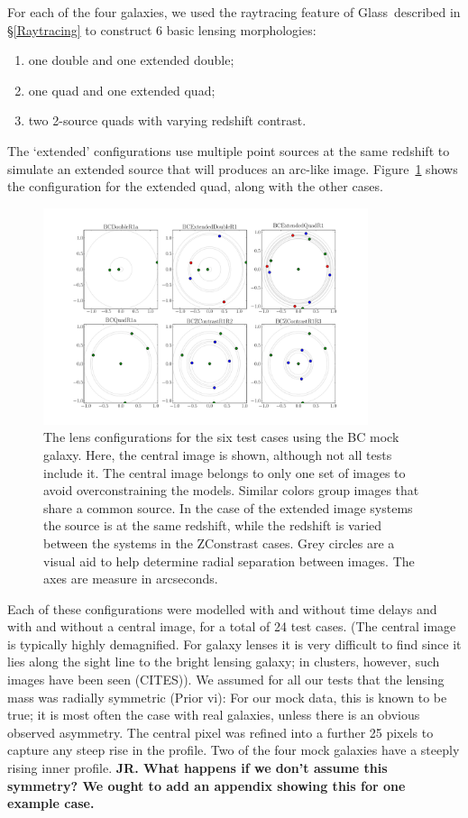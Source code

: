 \documentclass[galley,usenatbib]{mn2e}
\newcommand{\Glass}{{\sc Glass}}
\newcommand{\figref}[1] {Figure~\ref{#1}}
\newcommand{\secref}[1] {\S\ref{#1}}
\begin{document}
For each of the four galaxies, we used the raytracing feature of \Glass\
described in \secref{Raytracing} to construct 6 basic lensing morphologies:

\begin{enumerate}
\item one double and one extended double;
\item one quad and one extended quad;
\item two 2-source quads with varying redshift contrast.
\end{enumerate}
The `extended' configurations use multiple point sources at the same redshift
to simulate an extended source that will produces an arc-like image.
\figref{arrival surfaces} shows the configuration for the extended quad, along
with the other cases. 

\begin{figure}
\includegraphics[width=0.85\textwidth]{BCarrival_surfaces}
\caption{The lens configurations for the six test cases using the BC mock galaxy. Here,
the central image is shown, although not all tests include it. The central image belongs
to only one set of images to avoid overconstraining the models. Similar colors group
images that share a common source. In the case of the extended image systems the source
is at the same redshift, while the redshift is varied between the systems in the 
ZConstrast cases. Grey circles are a visual aid to help determine radial separation
between images. The axes are measure in arcseconds.}
\label{arrival surfaces}
\end{figure}

Each of these configurations were modelled with and without time delays and
with and without a central image, for a total of 24 test cases. (The central
image is typically highly demagnified. For galaxy lenses it is very difficult
to find since it lies along the sight line to the bright lensing galaxy; in
clusters, however, such images have been seen (CITES)). We assumed for all our
tests that the lensing mass was radially symmetric (Prior vi):
For our mock data, this is known to be
true; it is most often the case with real galaxies, unless there is an obvious
observed asymmetry. The central pixel was refined into a further 25 pixels to
capture any steep rise in the profile.  Two of the four mock galaxies have a
steeply rising inner profile. {\bf JR.  What happens if we don't assume this
symmetry? We ought to add an appendix showing this for one example case.}
\end{document}
